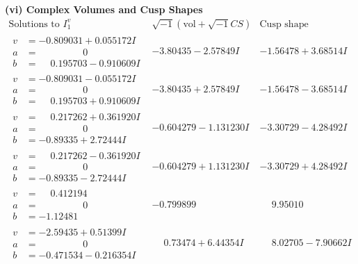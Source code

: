 \documentclass[1p]{elsarticle_modified}
\theoremstyle{definition}
\newcommand{\I}{\sqrt{-1}}
\begin{document}
\newpage\flushleft \textbf{(vi) Complex Volumes and Cusp Shapes}
$$\begin{array}{c|c|c}  
\text{Solutions to }I^v_{1}& \I (\text{vol} + \sqrt{-1}CS) & \text{Cusp shape}\\
 \hline 
\begin{aligned}
v &= -0.809031 + 0.055172 I \\
a &= \phantom{-0.000000 } 0 \\
b &= \phantom{-}0.195703 - 0.910609 I\end{aligned}
 & -3.80435 - 2.57849 I & -1.56478 + 3.68514 I \\ \hline\begin{aligned}
v &= -0.809031 - 0.055172 I \\
a &= \phantom{-0.000000 } 0 \\
b &= \phantom{-}0.195703 + 0.910609 I\end{aligned}
 & -3.80435 + 2.57849 I & -1.56478 - 3.68514 I \\ \hline\begin{aligned}
v &= \phantom{-}0.217262 + 0.361920 I \\
a &= \phantom{-0.000000 } 0 \\
b &= -0.89335 + 2.72444 I\end{aligned}
 & -0.604279 - 1.131230 I & -3.30729 - 4.28492 I \\ \hline\begin{aligned}
v &= \phantom{-}0.217262 - 0.361920 I \\
a &= \phantom{-0.000000 } 0 \\
b &= -0.89335 - 2.72444 I\end{aligned}
 & -0.604279 + 1.131230 I & -3.30729 + 4.28492 I \\ \hline\begin{aligned}
v &= \phantom{-}0.412194\phantom{ +0.000000I} \\
a &= \phantom{-0.000000 } 0 \\
b &= -1.12481\phantom{ +0.000000I}\end{aligned}
 & -0.799899\phantom{ +0.000000I} & \phantom{-}9.95010\phantom{ +0.000000I} \\ \hline\begin{aligned}
v &= -2.59435 + 0.51399 I \\
a &= \phantom{-0.000000 } 0 \\
b &= -0.471534 - 0.216354 I\end{aligned}
 & \phantom{-}0.73474 + 6.44354 I & \phantom{-}8.02705 - 7.90662 I \\ \hline\begin{aligned}

\end{aligned}
\end{array}$$
\end{document}
